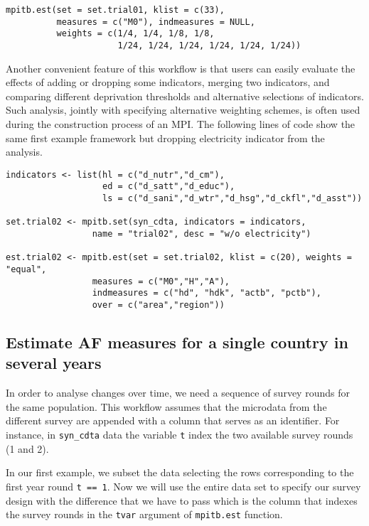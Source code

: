 \begin{verbatim}
mpitb.est(set = set.trial01, klist = c(33), 
          measures = c("M0"), indmeasures = NULL,
          weights = c(1/4, 1/4, 1/8, 1/8, 
                      1/24, 1/24, 1/24, 1/24, 1/24, 1/24))
\end{verbatim}

Another convenient feature of this workflow is that users can easily
evaluate the effects of adding or dropping some indicators, merging two
indicators, and comparing different deprivation thresholds and
alternative selections of indicators. Such analysis, jointly with
specifying alternative weighting schemes, is often used during the
construction process of an MPI. The following lines of code show the
same first example framework but dropping electricity indicator from the
analysis.

\begin{verbatim}
indicators <- list(hl = c("d_nutr","d_cm"),
                   ed = c("d_satt","d_educ"),
                   ls = c("d_sani","d_wtr","d_hsg","d_ckfl","d_asst"))

set.trial02 <- mpitb.set(syn_cdta, indicators = indicators,
                 name = "trial02", desc = "w/o electricity")

est.trial02 <- mpitb.est(set = set.trial02, klist = c(20), weights = "equal", 
                 measures = c("M0","H","A"), 
                 indmeasures = c("hd", "hdk", "actb", "pctb"),
                 over = c("area","region"))
\end{verbatim}

\hypertarget{estimate-af-measures-for-a-single-country-in-several-years}{%
\subsection{Estimate AF measures for a single country in several years}\label{estimate-af-measures-for-a-single-country-in-several-years}}

In order to analyse changes over time, we need a sequence of survey
rounds for the same population. This workflow assumes that the microdata
from the different survey are appended with a column that serves as an
identifier. For instance, in \texttt{syn\_cdta} data the variable \texttt{t} index the
two available survey rounds (1 and 2).

In our first example, we subset the data selecting the rows
corresponding to the first year round \texttt{t\ ==\ 1}. Now we will use the
entire data set to specify our survey design with the difference that we
have to pass which is the column that indexes the survey rounds in the
\texttt{tvar} argument of \texttt{mpitb.est} function.

